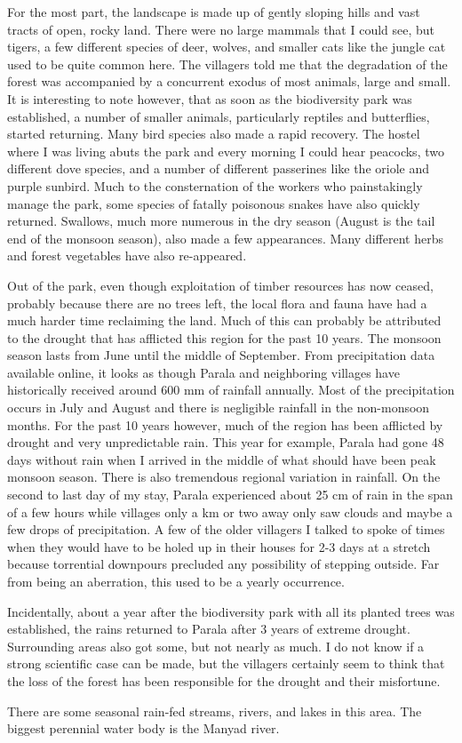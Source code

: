 \documentclass{article}
\begin{document}
For the most part, the landscape is made up of gently sloping hills and vast tracts of open, rocky land. There were no large mammals that I could see, but tigers, a few different species of deer, wolves, and smaller cats like the jungle cat used to be quite common here. The villagers told me that the degradation of the forest was accompanied by a concurrent exodus of most animals, large and small. It is interesting to note however, that as soon as the biodiversity park was established, a number of smaller animals, particularly reptiles and butterflies, started returning. Many bird species also made a rapid recovery. The hostel where I was living abuts the park and every morning I could hear peacocks, two different dove species, and a number of different passerines like the oriole and purple sunbird. Much to the consternation of the workers who painstakingly manage the park, some species of fatally poisonous snakes have also quickly returned. Swallows, much more numerous in the dry season (August is the tail end of the monsoon season), also made a few appearances. Many different herbs and forest vegetables have also re-appeared.

Out of the park, even though exploitation of timber resources has now ceased, probably because there are no trees left, the local flora and fauna have had a much harder time reclaiming the land. Much of this can probably be attributed to the drought that has afflicted this region for the past 10 years. The monsoon season lasts from June until the middle of September. From precipitation data available online, it looks as though Parala and neighboring villages have historically received around 600 mm of rainfall annually. Most of the precipitation occurs in July and August and there is negligible rainfall in the non-monsoon months. For the past 10 years however, much of the region has been afflicted by drought and very unpredictable rain. This year for example, Parala had gone 48 days without rain when I arrived in the middle of what should have been peak monsoon season. There is also tremendous regional variation in rainfall. On the second to last day of my stay, Parala experienced about 25 cm of rain in the span of a few hours while villages only a km or two away only saw clouds and maybe a few drops of precipitation. A few of the older villagers I talked to spoke of times when they would have to be holed up in their houses for 2-3 days at a stretch because torrential downpours precluded any possibility of stepping outside. Far from being an aberration, this used to be a yearly occurrence.

Incidentally, about a year after the biodiversity park with all its planted trees was established, the rains returned to Parala after 3 years of extreme drought. Surrounding areas also got some, but not nearly as much. I do not know if a strong scientific case can be made, but the villagers certainly seem to think that the loss of the forest has been responsible for the drought and their misfortune.

There are some seasonal rain-fed streams, rivers, and lakes in this area. The biggest perennial water body is the Manyad river.
\end{document}

